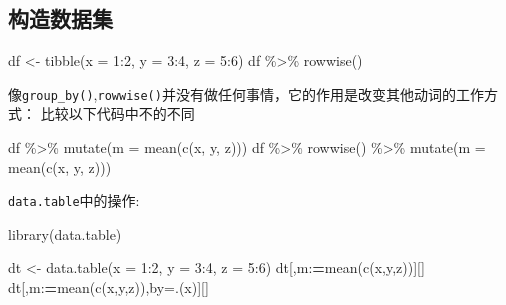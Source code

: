 \documentclass[
]{book}
\newenvironment{Shaded}{\begin{snugshade}}{\end{snugshade}}
\newcommand{\AttributeTok}[1]{\textcolor[rgb]{0.77,0.63,0.00}{#1}}
\newcommand{\DecValTok}[1]{\textcolor[rgb]{0.00,0.00,0.81}{#1}}
\newcommand{\ErrorTok}[1]{\textcolor[rgb]{0.64,0.00,0.00}{\textbf{#1}}}
\newcommand{\FunctionTok}[1]{\textcolor[rgb]{0.00,0.00,0.00}{#1}}
\newcommand{\NormalTok}[1]{#1}
\newcommand{\OtherTok}[1]{\textcolor[rgb]{0.56,0.35,0.01}{#1}}
\newcommand{\SpecialCharTok}[1]{\textcolor[rgb]{0.00,0.00,0.00}{#1}}
\begin{document}
\hypertarget{ux6784ux9020ux6570ux636eux96c6}{%
\subsection{构造数据集}\label{ux6784ux9020ux6570ux636eux96c6}}

\begin{Shaded}
\begin{Highlighting}[]
\NormalTok{df }\OtherTok{\textless{}{-}} \FunctionTok{tibble}\NormalTok{(}\AttributeTok{x =} \DecValTok{1}\SpecialCharTok{:}\DecValTok{2}\NormalTok{, }\AttributeTok{y =} \DecValTok{3}\SpecialCharTok{:}\DecValTok{4}\NormalTok{, }\AttributeTok{z =} \DecValTok{5}\SpecialCharTok{:}\DecValTok{6}\NormalTok{)}
\NormalTok{df }\SpecialCharTok{\%\textgreater{}\%} \FunctionTok{rowwise}\NormalTok{()}
\end{Highlighting}
\end{Shaded}

像\texttt{group\_by()},\texttt{rowwise()}并没有做任何事情，它的作用是改变其他动词的工作方式：
比较以下代码中不的不同

\begin{Shaded}
\begin{Highlighting}[]
\NormalTok{df }\SpecialCharTok{\%\textgreater{}\%} \FunctionTok{mutate}\NormalTok{(}\AttributeTok{m =} \FunctionTok{mean}\NormalTok{(}\FunctionTok{c}\NormalTok{(x, y, z)))}
\NormalTok{df }\SpecialCharTok{\%\textgreater{}\%} \FunctionTok{rowwise}\NormalTok{() }\SpecialCharTok{\%\textgreater{}\%} \FunctionTok{mutate}\NormalTok{(}\AttributeTok{m =} \FunctionTok{mean}\NormalTok{(}\FunctionTok{c}\NormalTok{(x, y, z)))}
\end{Highlighting}
\end{Shaded}

\texttt{data.table}中的操作:

\begin{Shaded}
\begin{Highlighting}[]
\FunctionTok{library}\NormalTok{(data.table)}

\NormalTok{dt }\OtherTok{\textless{}{-}} \FunctionTok{data.table}\NormalTok{(}\AttributeTok{x =} \DecValTok{1}\SpecialCharTok{:}\DecValTok{2}\NormalTok{, }\AttributeTok{y =} \DecValTok{3}\SpecialCharTok{:}\DecValTok{4}\NormalTok{, }\AttributeTok{z =} \DecValTok{5}\SpecialCharTok{:}\DecValTok{6}\NormalTok{)}
\NormalTok{dt[,m}\SpecialCharTok{:}\ErrorTok{=}\FunctionTok{mean}\NormalTok{(}\FunctionTok{c}\NormalTok{(x,y,z))][]}
\NormalTok{dt[,m}\SpecialCharTok{:}\ErrorTok{=}\FunctionTok{mean}\NormalTok{(}\FunctionTok{c}\NormalTok{(x,y,z)),by}\OtherTok{=}\NormalTok{.(x)][]}
\end{Highlighting}
\end{Shaded}
\end{document}
